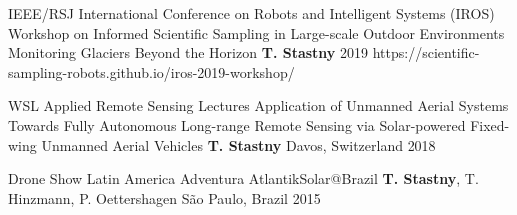 \label{sec:talks}

\begin{cventries}

\cvtalkentry
	{IEEE/RSJ International Conference on Robots and Intelligent Systems (IROS)} %
	{Workshop on Informed Scientific Sampling in Large-scale Outdoor Environments} %
	{Monitoring Glaciers Beyond the Horizon} %
	{\textbf{T. Stastny}} %
	{} %
	{2019} %
	{https://scientific-sampling-robots.github.io/iros-2019-workshop/} %
	
\cvtalkentry
	{WSL Applied Remote Sensing Lectures} %
	{Application of Unmanned Aerial Systems} %
	{Towards Fully Autonomous Long-range Remote Sensing via Solar-powered Fixed-wing Unmanned Aerial Vehicles} %
	{\textbf{T. Stastny}} %
	{Davos, Switzerland} %
	{2018} %
	{} %
	
\vspace*{-9pt}
\cvtalkentry
	{Drone Show Latin America} %
	{} %
	{Adventura AtlantikSolar@Brazil} %
	{\textbf{T. Stastny}, T. Hinzmann, P. Oettershagen} %
	{S\~{a}o Paulo, Brazil} %
	{2015} %
	{} %

\end{cventries}

